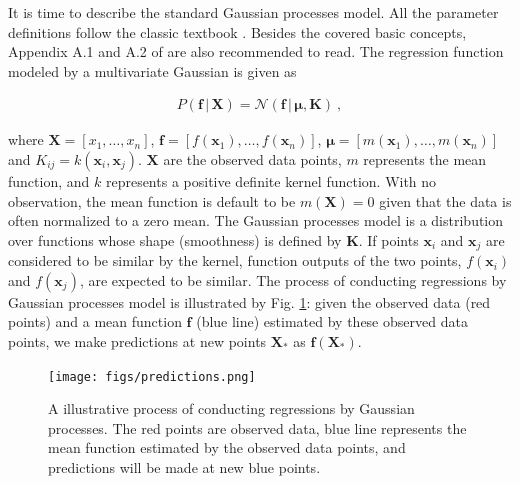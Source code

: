 \documentclass[preprint,12pt]{elsarticle}
\begin{document}
It is time to describe the standard Gaussian processes model. All the parameter definitions follow the classic textbook \cite{Rasmussen2006}. Besides the covered basic concepts, Appendix A.1 and A.2 of \cite{Rasmussen2006} are also recommended to read. The regression function modeled by a multivariate Gaussian is given as 
\begin{ceqn}
    \begin{align}
       P(\mathbf{f} \, \lvert\, \mathbf{X}) = \mathcal{N}(\mathbf{f} \, \lvert\, \boldsymbol\mu, \mathbf{K}) \ , \nonumber
    \end{align}
\end{ceqn}
where $\mathbf{X} = [{x}_1, \ldots, {x}_n ]$, $\mathbf{f} = \left[ f(\mathbf{x}_1), \ldots, f(\mathbf{x}_n) \right]$, $\boldsymbol\mu = \left[ m(\mathbf{x}_1), \ldots, m(\mathbf{x}_n) \right]$ and $K_{ij} = k(\mathbf{x}_i,\mathbf{x}_j)$. $\mathbf{X}$ are the observed data points, $m$ represents the mean function, and $k$ represents a positive definite kernel function. With no observation, the mean function is default to be $m(\mathbf{X}) = 0$ given that the data is often normalized to a zero mean. The Gaussian processes model is a distribution over functions whose shape (smoothness) is defined by $\mathbf{K}$. If points $\mathbf{x}_i$ and $\mathbf{x}_j$ are considered to be similar by the kernel, function outputs of the two points, $f(\mathbf{x}_i)$ and $f(\mathbf{x}_j)$, are expected to be similar. The process of conducting regressions by Gaussian processes model is illustrated by Fig. \ref{FIG:9}: given the observed data (red points) and a mean function $\mathbf{f}$ (blue line) estimated by these observed data points, we make predictions at new points $\mathbf{X}_*$ as $\mathbf{f}(\mathbf{X}_*)$.

\begin{figure}[h!]
	\centering
		\texttt{[image: figs/predictions.png]}
	\caption{A illustrative process of conducting regressions by Gaussian processes. The red points are observed data, blue line represents the mean function estimated by the observed data points, and predictions will be made at new blue points.}
	\label{FIG:9}
\end{figure}
\end{document}
